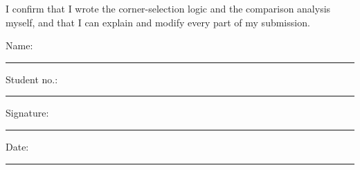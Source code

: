 \documentclass[conference]{IEEEtran}
\begin{document}
\vspace{1.5em}
\noindent I confirm that I wrote the corner-selection logic and the comparison
analysis myself, and that I can explain and modify every part of my
submission.

\vspace{2.5em}
\noindent Name: \rule{3.6cm}{0.4pt}\hfill Student no.: \rule{2.6cm}{0.4pt}\hfill
Signature: \rule{3.2cm}{0.4pt}\hfill Date: \rule{2.2cm}{0.4pt}
\end{document}
